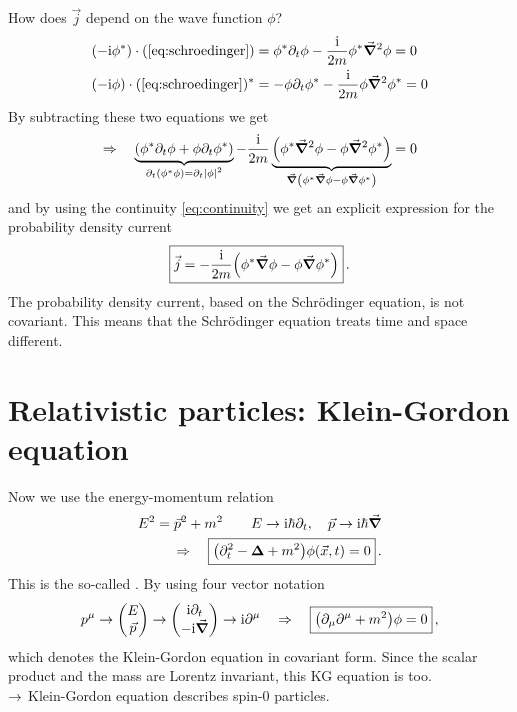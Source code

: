 How does $\vec j$ depend on the wave function $\phi$?
\begin{align*}
    \qty(-\ti \phi^*) \cdot (\cref{eq:schroedinger}) & = \phi^*\pa_t \phi - \frac{\ti}{2m} \phi^* \vec \grad ^2 \phi = 0 \\
    \qty(- \ti \phi) \cdot (\cref{eq:schroedinger})^* & = - \phi \pa_t \phi^* - \frac{\ti}{2m} \phi \vec \grad ^2 \phi^* = 0
\end{align*}
By subtracting these two equations we get
\begin{align}
    \Rightarrow \quad \underbrace{\qty(\phi^*\partial_t \phi + \phi \partial_t \phi^*)}_{\partial_t \qty(\phi^*\phi) = \partial_t \qty|\phi|^2} - \frac{\mathrm{i}}{2m} \underbrace{\qty(\phi^* \vec \grad ^2 \phi - \phi \vec \grad^2 \phi^*)}_{\vec \grad \qty(\phi^*\vec \grad \phi - \phi \vec \grad \phi^*)} = 0
\end{align}
and by using the continuity \cref{eq:continuity} we get an explicit expression for the probability density current
\begin{align}
    \boxed{ \vec j = - \frac{\mathrm{i}}{2m}\qty(\phi^*\vec \grad \phi - \phi \vec \grad \phi^*) }\,.
\end{align}
The probability density current, based on the Schrödinger equation, is not covariant. This means that the Schrödinger equation treats time and space different.

\section{Relativistic particles: Klein-Gordon equation}
Now we use the  energy-momentum relation
\begin{align}
    E^2 = \vec p^2 +m^2 \qquad E \rightarrow \mathrm{i} \hbar \partial_t, \quad \vec p \rightarrow \mathrm{i} \hbar \vec \grad\nonumber \\
    \Rightarrow \quad \boxed{\qty(\partial_t^2 - \bm{\Delta} +m^2) \phi \qty(\vec x, t) = 0}\,.
\end{align}
This is the so-called . By using four vector notation
\begin{align}
    p^\mu \ra \mqty(E \\ \vec p) \ra \mqty(\ti \pa_t \\ - \ti \vec \grad) \ra \ti \pa^\mu \quad \Ra \quad \boxed{\qty(\pa_\mu\pa^\mu + m^2) \phi = 0}\,,
\end{align}
which denotes the Klein-Gordon equation in covariant form. Since the scalar product and the mass are Lorentz invariant, this KG equation is too.\\
$\rightarrow$ Klein-Gordon equation describes spin-0 particles.

